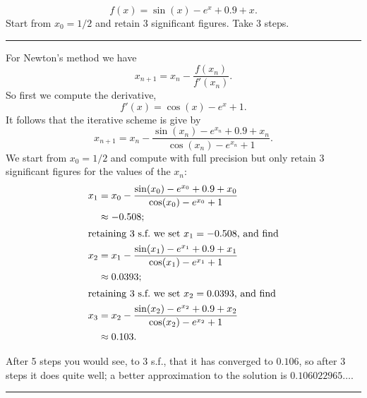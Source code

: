 \documentclass[10pt]{article}
\begin{document}
\begin{enumerate}
\begin{equation*}
    f(x) = \sin(x) - e^x + 0.9 + x.
  \end{equation*}
  Start from $x_0=1/2$ and retain 3 significant figures. Take 3 steps.
  \begin{center}
    \rule{0.9\textwidth}{.1pt}
  \end{center}
  For Newton's method we have
  \begin{equation*}
    x_{n+1} = x_n - \frac{f(x_n)}{f'(x_n)}.
  \end{equation*}
  So first we compute the derivative,
  \begin{equation*}
    f'(x) = \cos(x) - e^x + 1.
  \end{equation*}
  It follows that the iterative scheme is give by
  \begin{equation*}
    x_{n+1} = x_n - \frac{\sin(x_n) - e^{x_n} + 0.9 + x_n}{\cos(x_n) -
      e^{x_n} + 1}. 
  \end{equation*}
  We start from $x_0=1/2$ and compute with full precision but only
  retain 3 significant figures for the values of the $x_n$:
  \begin{align*}
    x_1 & = x_0 - \frac{\sin(x_0) - e^{x_0} + 0.9 + x_0}{\cos(x_0) -
      e^{x_0} + 1} \\
    & \approx -0.508; \\
    \intertext{retaining 3 s.f.\ we set $x_1 = -0.508$, and find}
    x_2 & = x_1 - \frac{\sin(x_1) - e^{x_1} + 0.9 + x_1}{\cos(x_1) -
      e^{x_1} + 1} \\
    & \approx 0.0393; \\
    \intertext{retaining 3 s.f.\ we set $x_2 = 0.0393$, and find}
    x_3 & = x_2 - \frac{\sin(x_2) - e^{x_2} + 0.9 + x_2}{\cos(x_2) -
      e^{x_2} + 1} \\
    & \approx 0.103.
  \end{align*}
  
  After 5 steps you would see, to 3 s.f., that it has converged to
  $0.106$, so after 3 steps it does quite well; a better approximation
  to the solution is $0.106022965\dots$.
  \begin{center}
    \rule{0.9\textwidth}{.1pt}
  \end{center}
\end{enumerate}
\end{document}
